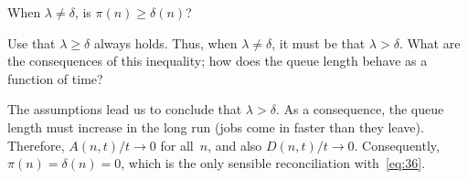 \documentclass[stochastic-or.tex]{subfiles}
\begin{document}
\begin{exercise}\label{ex:26}
 When $\lambda\neq \delta$, is $\pi(n)\geq \delta(n)$?
\begin{hint}
 Use that $\lambda \geq \delta$ always holds. Thus, when $\lambda \neq \delta$, it must be that $\lambda > \delta$. What are the consequences of this inequality; how does the queue length behave as a function of time?
\end{hint}
\begin{solution}
 The assumptions lead us to conclude that $\lambda > \delta$. As a consequence, the queue length must increase in the long run (jobs come in faster than they leave). Therefore, $A(n,t)/t \to 0$ for all~$n$, and also $D(n,t)/t\to 0$. Consequently, $\pi(n) = \delta(n) = 0$, which is the only sensible reconciliation with~\cref{eq:36}.
\end{solution}
\end{exercise}






\end{document}
